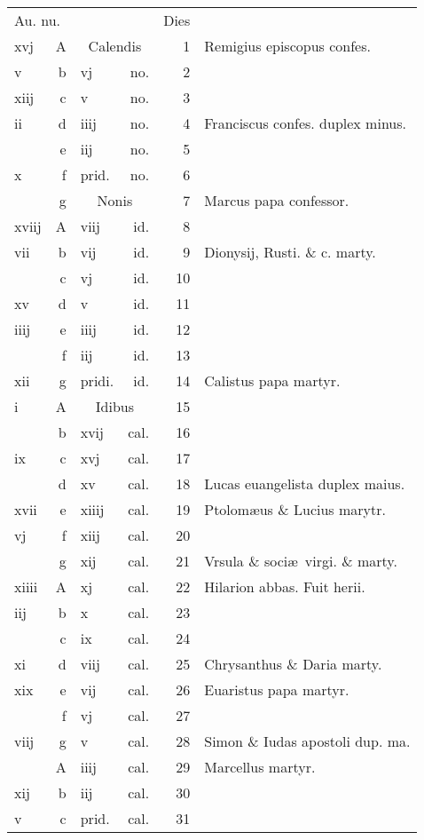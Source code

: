 \documentclass[a5paper,10pt]{book}
\begin{document}
\begin{center}
\begin{tabular}{l r l r r l}
\multicolumn{2}{l}{\color{red}Au. nu.} & & & \color{red} Dies & \\
xvj & \color{red} A & \multicolumn{2}{c}{\color{red} Calendis} & 1 & Remigius episcopus confes. \\
v & b & vj & no. & 2 & \\
xiij & c & v & no. & 3 & \\
ii & d & iiij & no. & 4 & \color{red} Franciscus confes. duplex minus. \color{black} \\
 & e & iij & no. & 5 & \\
x & f & \color{red} prid. & no. & 6 & \\
 & g & \multicolumn{2}{c}{\color{red} Nonis} & 7 & Marcus papa confessor. \color{black} \\
xviij & \color{red} A & viij & id. & 8 & \\
vii & b & vij & id. & 9 & Dionysij, Rusti. \& c. marty. \color{black} \\
 & c & vj & id. & 10 & \\
xv & d & v & id. & 11 & \\
iiij & e & iiij & id. & 12 & \\
 & f & iij & id. & 13 & \\
xii & g & \color{red} pridi. & id. & 14 & Calistus papa martyr. \\
i & \color{red} A & \multicolumn{2}{c}{\color{red} Idibus} & 15 & \\
 & b & xvij & cal. & 16 & \\
ix & c & xvj & cal. & 17 & \\
 & d & xv & cal. & 18 & \color{red} Lucas euangelista duplex maius. \color{black} \\
xvii & e & xiiij & cal. & 19 & Ptolom\ae us \& Lucius marytr. \color{black} \\
vj & f & xiij & cal. & 20 & \\
 & g & xij & cal. & 21 & Vrsula \& soci\ae \ virgi. \& marty. \\
xiiii & \color{red} A & xj & cal. & 22 & Hilarion abbas. \color{red} Fuit herii. \\%
iij & b & x & cal. & 23 & \\
 & c & ix & cal. & 24 & \\
xi & d & viij & cal. & 25 & Chrysanthus \& Daria marty. \\
xix & e & vij & cal. & 26 & Euaristus papa martyr. \\
 & f & vj & cal. & 27 & \\
viij & g & v & cal. & 28 & \color{red} Simon \& Iudas apostoli dup. ma. \color{black} \\
 & \color{red} A & iiij & cal. & 29 & Marcellus martyr. \color{black} \\
xij & b & iij & cal. & 30 & \\
v & c & \color{red} prid. & cal. & 31 & \\
\end{tabular}
\end{center}
\end{document}
